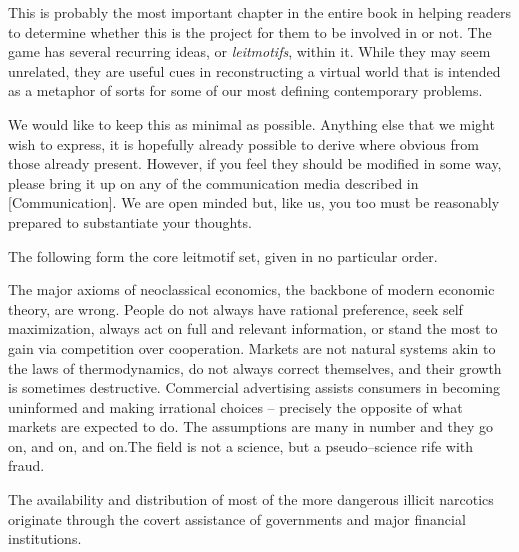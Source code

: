 

This is probably the most important chapter in the entire book in helping readers to determine whether this is the project for them to be involved in or not. The game has several recurring ideas, or {\it leitmotifs}, within it. While they may seem unrelated, they are useful cues in reconstructing a virtual world that is intended as a metaphor of sorts for some of our most defining contemporary problems.

We would like to keep this  as minimal as possible. Anything else that we might wish to express, it is hopefully already possible to derive where obvious from those already present. However, if you feel they should be modified in some way, please bring it up on any of the communication media described in [Communication]. We are open minded but, like us, you too must be reasonably prepared to substantiate your thoughts.

The following form the core leitmotif set, given in no particular order. 

\startitemize[4]

The major axioms of neoclassical economics, the backbone of modern economic theory, are wrong. People do not always have rational preference, seek self maximization, always act on full and relevant information, or stand the most to gain via competition over cooperation. Markets are not natural systems akin to the laws of thermodynamics, do not always correct themselves, and their growth is sometimes destructive. Commercial advertising assists consumers in becoming uninformed and making irrational choices -- precisely the opposite of what markets are expected to do. The assumptions are many in number and they go on, and on, and on.\footnotecite[lasn2012]\footnotecite[h2oil]\footnotecite[raj2010]\footnotecite[cobb1999]\footnotecite[extras={ See sections 4.6 and 4.11.}][agenda_21] The field is not a science, but a pseudo--science rife with fraud.


The availability and distribution of most of the more dangerous illicit narcotics originate through the covert assistance of governments and major financial institutions.\footnotecite[webb1996] 

